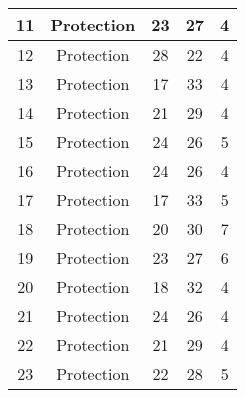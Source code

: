 \documentclass[results.tex]{subfiles}
\begin{document}
\begin{center}
\begin{tabular}{| c || c | c | c | c |}
            \hline
            11                      & Protection                   & 23                     & 27                      & 4                    \\
            \hline
            12                      & Protection                   & 28                     & 22                      & 4                    \\
            \hline
            13                      & Protection                   & 17                     & 33                      & 4                    \\
            \hline
            14                      & Protection                   & 21                     & 29                      & 4                    \\
            \hline
            15                      & Protection                   & 24                     & 26                      & 5                    \\
            \hline
            16                      & Protection                   & 24                     & 26                      & 4                    \\
            \hline
            17                      & Protection                   & 17                     & 33                      & 5                    \\
            \hline
            18                      & Protection                   & 20                     & 30                      & 7                    \\
            \hline
            19                      & Protection                   & 23                     & 27                      & 6                    \\
            \hline
            20                      & Protection                   & 18                     & 32                      & 4                    \\
            \hline
            21                      & Protection                   & 24                     & 26                      & 4                    \\
            \hline
            22                      & Protection                   & 21                     & 29                      & 4                    \\
            \hline
            23                      & Protection                   & 22                     & 28                      & 5                    \\

\end{tabular}
\end{center}
\end{document}
